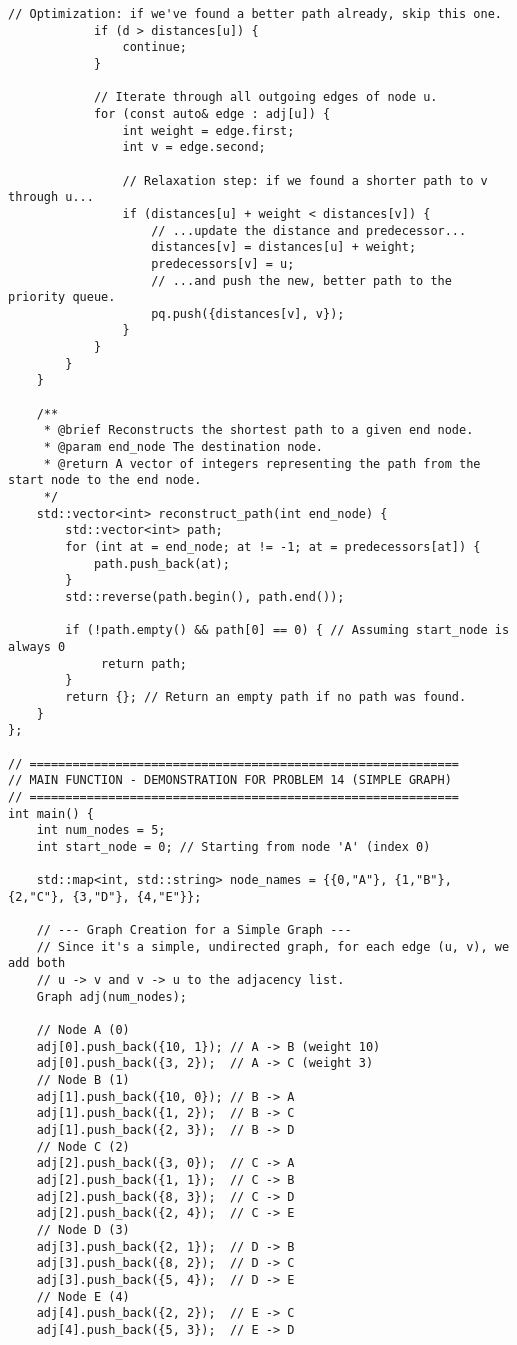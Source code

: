 \documentclass[a4paper,12pt]{article}
\begin{document}
\begin{lstlisting}[style=cppstyle, caption={Cài đặt Dijkstra bằng C++ sử dụng lớp và truy vết.}, label={lst:cpp}]
            // Optimization: if we've found a better path already, skip this one.
            if (d > distances[u]) {
                continue;
            }

            // Iterate through all outgoing edges of node u.
            for (const auto& edge : adj[u]) {
                int weight = edge.first;
                int v = edge.second;

                // Relaxation step: if we found a shorter path to v through u...
                if (distances[u] + weight < distances[v]) {
                    // ...update the distance and predecessor...
                    distances[v] = distances[u] + weight;
                    predecessors[v] = u;
                    // ...and push the new, better path to the priority queue.
                    pq.push({distances[v], v});
                }
            }
        }
    }

    /**
     * @brief Reconstructs the shortest path to a given end node.
     * @param end_node The destination node.
     * @return A vector of integers representing the path from the start node to the end node.
     */
    std::vector<int> reconstruct_path(int end_node) {
        std::vector<int> path;
        for (int at = end_node; at != -1; at = predecessors[at]) {
            path.push_back(at);
        }
        std::reverse(path.begin(), path.end());
        
        if (!path.empty() && path[0] == 0) { // Assuming start_node is always 0
             return path;
        }
        return {}; // Return an empty path if no path was found.
    }
};

// ============================================================
// MAIN FUNCTION - DEMONSTRATION FOR PROBLEM 14 (SIMPLE GRAPH)
// ============================================================
int main() {
    int num_nodes = 5;
    int start_node = 0; // Starting from node 'A' (index 0)

    std::map<int, std::string> node_names = {{0,"A"}, {1,"B"}, {2,"C"}, {3,"D"}, {4,"E"}};
    
    // --- Graph Creation for a Simple Graph ---
    // Since it's a simple, undirected graph, for each edge (u, v), we add both
    // u -> v and v -> u to the adjacency list.
    Graph adj(num_nodes);
    
    // Node A (0)
    adj[0].push_back({10, 1}); // A -> B (weight 10)
    adj[0].push_back({3, 2});  // A -> C (weight 3)
    // Node B (1)
    adj[1].push_back({10, 0}); // B -> A
    adj[1].push_back({1, 2});  // B -> C
    adj[1].push_back({2, 3});  // B -> D
    // Node C (2)
    adj[2].push_back({3, 0});  // C -> A
    adj[2].push_back({1, 1});  // C -> B
    adj[2].push_back({8, 3});  // C -> D
    adj[2].push_back({2, 4});  // C -> E
    // Node D (3)
    adj[3].push_back({2, 1});  // D -> B
    adj[3].push_back({8, 2});  // D -> C
    adj[3].push_back({5, 4});  // D -> E
    // Node E (4)
    adj[4].push_back({2, 2});  // E -> C
    adj[4].push_back({5, 3});  // E -> D
    

\end{lstlisting}
\end{document}
